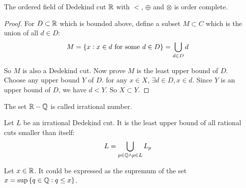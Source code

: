 \begin{theorem}\label{dedekind_real_order_complete}
    The ordered field of Dedekind cut $\mathbb{R}$ with $<$, $\oplus$ and $\otimes$  is order complete.    
\end{theorem}
\begin{proof}
    For $D \subset \mathbb{R}$ which is bounded above, define a subset $M \subset C$ which is the union of all $d \in D$:
    \begin{equation}
        M = \set{x: x \in d \text{ for some } d \in D} =\bigcup_{d \in D} d
    \end{equation}
    
    So $M$ is also a Dedekind cut. Now prove $M$ is the least upper bound of $D$. Choose any upper bound $Y$ of $D$. for any $x \in X$, $\exists d \in D,  x \in d$. Since $Y$ is an upper bound of $D$, we have $d < Y$. So $X \subset Y$.
\end{proof}

\begin{definition}
    The set $\mathbb{R} - \mathbb{Q}$ is called irrational number.
\end{definition}

\begin{theorem}
    Let $L$ be an irrational Dedekind cut. It is the least upper bound of all rational cuts smaller than itself:
    \begin{equation}
        L = \bigcup_{p \in \mathbb{Q} \wedge p \in L} L_p
    \end{equation}    
\end{theorem}


\begin{theorem}
Let $x \in \mathbb{R}$. It could be expressed as the supremum of the set $x = \sup \set{q \in \mathbb{Q}: q \leq x}$.
\end{theorem}



